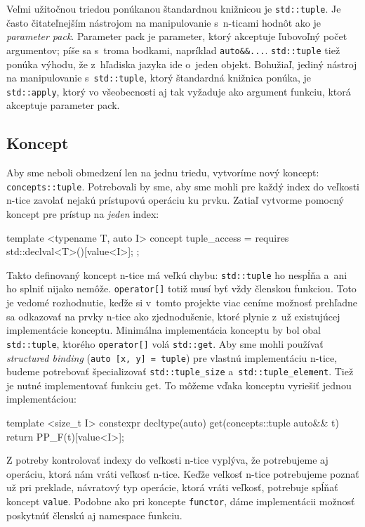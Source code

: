 Veľmi užitočnou triedou ponúkanou štandardnou knižnicou je \texttt{std::tuple}. Je často čitateľnejším nástrojom na manipulovanie s~n-ticami hodnôt ako je \emph{parameter pack}. Parameter pack je parameter, ktorý akceptuje ľubovoľný počet argumentov; píše sa s~troma bodkami, napríklad \texttt{auto\&\&...}. \texttt{std::tuple} tiež ponúka výhodu, že z~hľadiska jazyka ide o~jeden objekt. Bohužiaľ, jediný nástroj na manipulovanie s~\texttt{std::tuple}, ktorý štandardná knižnica ponúka, je \texttt{std::apply}, ktorý vo všeobecnosti aj tak vyžaduje ako argument funkciu, ktorá akceptuje parameter pack.

\subsection{Koncept}

Aby sme neboli obmedzení len na jednu triedu, vytvoríme nový koncept: \texttt{concepts::tuple}. Potrebovali by sme, aby sme mohli pre každý index do veľkosti n-tice zavolať nejakú prístupovú operáciu ku prvku. Zatiaľ vytvorme pomocný koncept pre prístup na \emph{jeden} index:
\begin{code}
template <typename T, auto I>
concept tuple_access = requires { std::declval<T>()[value<I>]; };
\end{code}
Takto definovaný koncept n-tice má veľkú chybu: \texttt{std::tuple} ho nespĺňa a~ani ho splniť nijako nemôže. \texttt{operator[]} totiž musí byť vždy členskou funkciou. Toto je vedomé rozhodnutie, keďže si v~tomto projekte viac ceníme možnosť prehľadne sa odkazovať na prvky n-tice ako zjednodušenie, ktoré plynie z~už existujúcej implementácie konceptu. Minimálna implementácia konceptu by bol obal \texttt{std::tuple}, ktorého \texttt{operator[]} volá \texttt{std::get}. Aby sme mohli používať \emph{structured binding} (\texttt{auto~[x,~y] = tuple}) pre vlastnú implementáciu n-tice, budeme potrebovať špecializovať \texttt{std::tuple\_size} a~\texttt{std::tuple\_element}. Tiež je nutné implementovať funkciu get. To môžeme vďaka konceptu vyriešiť jednou implementáciou:
\begin{code}
template <size_t I>
constexpr decltype(auto) get(concepts::tuple auto&& t)
{ return PP_F(t)[value<I>]; }
\end{code}

Z potreby kontrolovať indexy do veľkosti n-tice vyplýva, že potrebujeme aj operáciu, ktorá nám vráti veľkosť n-tice. Keďže veľkosť n-tice potrebujeme poznať už pri preklade, návratový typ operácie, ktorá vráti veľkosť, potrebuje spĺňať koncept \texttt{value}. Podobne ako pri koncepte \texttt{functor}, dáme implementácii možnosť poskytnúť členskú aj namespace funkciu.

